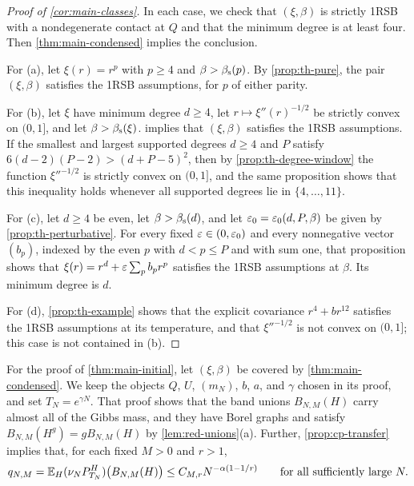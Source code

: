 \begin{proof}[Proof of \cref{cor:main-classes}]
In each case, we check that $(\xi,\beta)$ is strictly 1RSB with a nondegenerate contact at $Q$ and that the minimum degree is at least four. Then \cref{thm:main-condensed} implies the conclusion.

For (a), let $\xi(r)=r^p$ with $p\ge4$ and $\beta>\beta_{\mathrm s}(p)$. By \cref{prop:th-pure}, the pair $(\xi,\beta)$ satisfies the 1RSB assumptions, for $p$ of either parity.

For (b), let $\xi$ have minimum degree $d\ge4$, let $r\mapsto\xi''(r)^{-1/2}$ be strictly convex on $(0,1]$, and let $\beta>\beta_{\mathrm s}(\xi)$.  implies that $(\xi,\beta)$ satisfies the 1RSB assumptions. If the smallest and largest supported degrees $d\ge4$ and $P$ satisfy $6(d-2)(P-2)>(d+P-5)^2$, then by \cref{prop:th-degree-window} the function $\xi''^{-1/2}$ is strictly convex on $(0,1]$, and the same proposition shows that this inequality holds whenever all supported degrees lie in $\{4,\dots,11\}$.

For (c), let $d\ge4$ be even, let $\beta>\beta_{\mathrm s}(d)$, and let $\varepsilon_0=\varepsilon_0(d,P,\beta)$ be given by \cref{prop:th-perturbative}. For every fixed $\varepsilon\in(0,\varepsilon_0)$ and every nonnegative vector $(b_p)$, indexed by the even $p$ with $d<p\le P$ and with sum one, that proposition shows that $\xi(r)=r^d+\varepsilon\sum_pb_pr^p$ satisfies the 1RSB assumptions at $\beta$. Its minimum degree is $d$.

For (d), \cref{prop:th-example} shows that the explicit covariance $r^4+b r^{12}$ satisfies the 1RSB assumptions at its temperature, and that $\xi''^{-1/2}$ is not convex on $(0,1]$; this case is not contained in (b).
\end{proof}

For the proof of \cref{thm:main-initial}, let $(\xi,\beta)$ be covered by \cref{thm:main-condensed}. We keep the objects $Q$, $U$, $(m_N)$, $b$, $a$, and $\gamma$ chosen in its proof, and set $T_N=e^{\gamma N}$. That proof shows that the band unions $B_{N,M}(H)$ carry almost all of the Gibbs mass, and they have Borel graphs and satisfy $B_{N,M}(H^g)=gB_{N,M}(H)$ by \cref{lem:red-unions}(a). Further, \cref{prop:cp-transfer} implies that, for each fixed $M>0$ and $r>1$,
\begin{equation}\label{eq:cp-endpoint}
q_{N,M}=\mathbb E_H(\nu_NP^H_{T_N})\bigl(B_{N,M}(H)\bigr)\le C_{M,r}N^{-\alpha(1-1/r)}\qquad\text{for all sufficiently large }N.
\end{equation}

